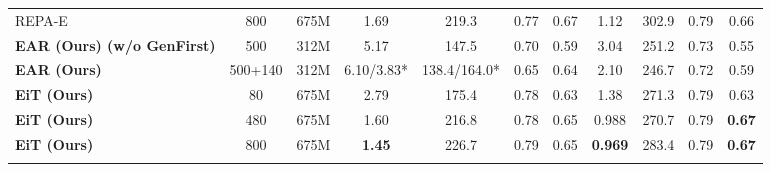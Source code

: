 \documentclass[]{bytedance_seed}
\begin{document}
\begin{table}[]
{\begin{tabular}{l cc cccc cccc}
REPA-E~\citep{repa_e}  & 800 & 675M &  1.69 & 219.3 & 0.77 & 0.67 & 1.12 & 302.9 & 0.79 & 0.66 \\
\rowcolor{blue!8}\textbf{EAR (Ours) (w/o GenFirst)} & 500 & 312M & 5.17 & 147.5 & 0.70 &
0.59 & 3.04 & 251.2 & 0.73 & 0.55\\
\rowcolor{blue!8}\textbf{EAR (Ours)} & 500+140 & 312M & 6.10/3.83* & 138.4/164.0* & 0.65 & 0.64 & 2.10 & 246.7 & 0.72 & 0.59 \\
\rowcolor{blue!8}\textbf{EiT (Ours)} & 80 & 675M & 2.79 & 175.4 & 0.78 & 0.63 & 1.38 & 271.3 & 0.79 & 0.63 \\
\rowcolor{blue!8}\textbf{EiT (Ours)} & 480 & 675M & 1.60 & 216.8	& 0.78	& 0.65 & 0.988 & 270.7 & 0.79	& \textbf{0.67}\\
\rowcolor{blue!8}\textbf{EiT (Ours)} & 800 & 675M & \textbf{1.45}	& 226.7	& 0.79	& 0.65 & \textbf{0.969} & 283.4 & 0.79	& \textbf{0.67}\\
\arrayrulecolor{black}\bottomrule
\end{tabular}
}
\label{tab:imagenet256_sota}
\end{table}
\end{document}
